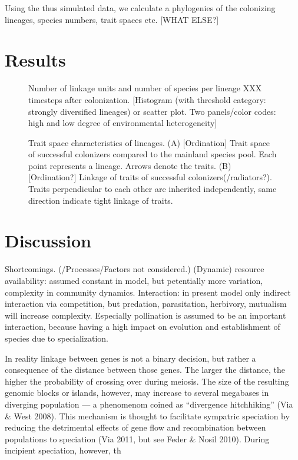 \documentclass[a4paper]{scrartcl}
\begin{document}
Using the thus simulated data, we calculate a phylogenies of the colonizing lineages, species numbers, trait spaces etc. [WHAT ELSE?]

\section{Results}

\begin{figure}
  \caption{Number of linkage units and number of species per lineage XXX timesteps after colonization.
    [Histogram (with threshold category: strongly diversified lineages) or scatter plot. Two panels/color codes: high and low degree of environmental heterogeneity]}
  \label{specieslinkage}
\end{figure}

\begin{figure}
  \caption{Trait space characteristics of lineages.
    (A) [Ordination] Trait space of successful colonizers compared to the mainland species pool. Each point represents a lineage.
    Arrows denote the traits.
    (B) [Ordination?] Linkage of traits of successful colonizers(/radiators?). Traits perpendicular to each other are inherited independently,
  same direction indicate tight linkage of traits.}
  \label{traitspace}
\end{figure}


\section{Discussion}
Shortcomings. (/Processes/Factors not considered.)
(Dynamic) resource availability: assumed constant in model, but petentially more variation, complexity in community dynamics.
Interaction: in present model only indirect interaction via competition, but predation, parasitation, herbivory, mutualism will increase complexity.
Especially pollination is assumed to be an important interaction, because having a high impact on evolution and establishment of species due to specialization.

In reality linkage between genes is not a binary decision, but rather a consequence of the distance between those genes.
The larger the distance, the higher the probability of crossing over during meiosis.
The size of the resulting genomic blocks or islands, however, may increase to several megabases in diverging population ---
a phenomenom coined as ``divergence hitchhiking'' (Via \& West 2008). %
This mechanism is thought to facilitate sympatric speciation by reducing the detrimental effects of gene flow and
recombination between populations to speciation (Via 2011, but see Feder \& Nosil 2010).
During incipient speciation, however, th
\end{document}
